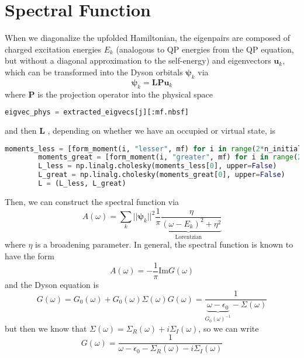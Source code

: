 \section{Spectral Function}
When we diagonalize the upfolded Hamiltonian, the eigenpairs are composed of charged excitation energies $E_k$ (analogous to QP energies from the QP equation, but without a diagonal approximation to the self-energy)  and eigenvectors $\bm{u}_k$, which can be transformed into the Dyson orbitals $\bm{\psi}_k$ via
\begin{equation}
    \bm{\psi}_k = \bm{L}\bm{P}\bm{u}_k
\end{equation}
where $\bm{P}$ is the projection operator into the physical space
\begin{lstlisting}[language=Python]
eigvec_phys = extracted_eigvecs[j][:mf.nbsf]
\end{lstlisting}
and then $\bm{L}$ , depending on whether we have an occupied or virtual state, is
\begin{lstlisting}[language=Python]
        moments_less = [form_moment(i, "lesser", mf) for i in range(2*n_initial+2)]
        moments_great = [form_moment(i, "greater", mf) for i in range(2*n_initial+2)]
        L_less = np.linalg.cholesky(moments_less[0], upper=False)
        L_great = np.linalg.cholesky(moments_great[0], upper=False)
        L = (L_less, L_great)
\end{lstlisting}
Then, we can construct the spectral function via
\begin{equation}
    A(\omega) = \sum_k ||\bm{\psi}_k||^2 \underbrace{\frac{1}{\pi} \frac{\eta}{\left( \omega - E_k \right)^2 + \eta^2}}_{\text{Lorentzian}}
\end{equation}
where $\eta$ is a broadening parameter. In general, the spectral function is known to have the form
\begin{equation}
    A(\omega) = -\frac{1}{\pi} \text{Im} G\left(\omega\right)
\end{equation}
and the Dyson equation is 
\begin{equation}
    G(\omega) = G_0(\omega) + G_0(\omega) \Sigma(\omega) G(\omega) = \frac{1}{\underbrace{\omega - \epsilon_0}_{G_0(\omega)^{-1}} - \Sigma(\omega)}
\end{equation}
but then we know that $\Sigma(\omega) = \Sigma_R(\omega) + i\Sigma_I(\omega)$, so we can write
\begin{equation}
    G(\omega) = \frac{1}{{\omega - \epsilon_0} - \Sigma_R(\omega) - i\Sigma_I(\omega)}
\end{equation}
